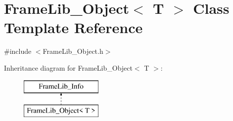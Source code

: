 \hypertarget{class_frame_lib___object}{}\section{Frame\+Lib\+\_\+\+Object$<$ T $>$ Class Template Reference}
\label{class_frame_lib___object}


{\ttfamily \#include $<$Frame\+Lib\+\_\+\+Object.\+h$>$}

Inheritance diagram for Frame\+Lib\+\_\+\+Object$<$ T $>$\+:\begin{figure}[H]
\begin{center}
\leavevmode
\includegraphics[height=2.000000cm]{class_frame_lib___object}
\end{center}
\end{figure}
